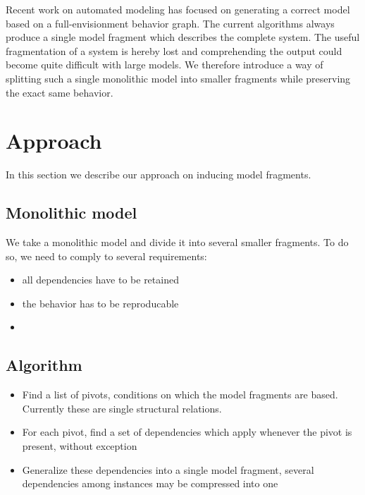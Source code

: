 \documentclass{article}
\begin{document}
Recent work on automated modeling \cite{buisman, vanweelden, liem} has focused
on generating a correct model based on a full-envisionment behavior graph. The
current algorithms always produce a single model fragment which describes the
complete system. The useful fragmentation of a system is hereby lost and
comprehending the output could become quite difficult with large models. We
therefore introduce a way of splitting such a single monolithic model into
smaller fragments while preserving the exact same behavior.

\section{Approach}
In this section we describe our approach on inducing model fragments.

\subsection{Monolithic model}

We take a monolithic model and divide it into several smaller fragments. To do
so, we need to comply to several requirements:

\begin{itemize}
\item all dependencies have to be retained

\item the behavior has to be reproducable

\item 

\end{itemize}

\subsection{Algorithm}

\begin{itemize}

\item Find a list of pivots, conditions on which the model fragments are based.
Currently these are single structural relations.

\item For each pivot, find a set of dependencies which apply whenever the pivot
is present, without exception

\item Generalize these dependencies into a single model fragment, several
dependencies among instances may be compressed into one

\end{itemize}
\end{document}
